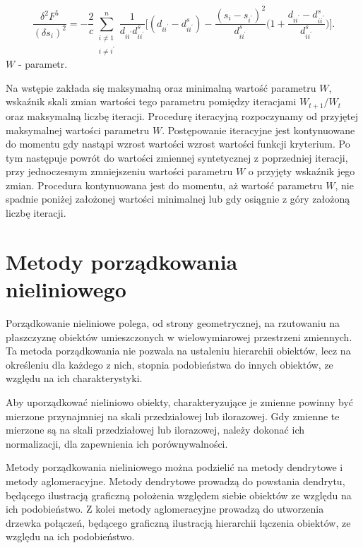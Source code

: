 \documentclass[12pt,a4paper]{report}
\begin{document}
\begin{equation}
\frac{\delta^2 F^{5}}{(\delta s_{i})^{2}}=-\frac{2}{c}\sum_{\substack{i\neq1 \\ i \neq i^{'}}}^n \frac{1}{d_{ii^{'}}d_{ii^{'}}^{s}} \bigg[ (d_{ii^{'}} - d_{ii^{'}}^s) - \frac{(s_i - s_{i^{'}})^2}{d_{ii^{'}}^s} \bigg( 1+ \frac{d_{ii^{'}}-d_{ii^{'}}^{s}}{d_{ii^{'}}^s} \bigg) \bigg].
\end{equation}
\newline
$W$ - parametr.

Na wstępie zakłada się maksymalną oraz minimalną wartość parametru $W$, wskaźnik skali zmian wartości tego parametru pomiędzy iteracjami $W_{t+1}/W_{t}$ oraz maksymalną liczbę iteracji. Procedurę iteracyjną rozpoczynamy od przyjętej maksymalnej wartości parametru $W$. Postępowanie iteracyjne jest kontynuowane do momentu gdy nastąpi wzrost wartości wzrost wartości funkcji kryterium. Po tym następuje powrót do wartości zmiennej syntetycznej z poprzedniej iteracji, przy jednoczesnym zmniejszeniu wartości parametru $W$ o przyjęty wskaźnik jego zmian. Procedura kontynuowana jest do momentu, aż wartość parametru $W$, nie spadnie poniżej założonej wartości minimalnej lub gdy osiągnie z góry założoną liczbę iteracji. 

\section{Metody porządkowania nieliniowego}
\noindent

Porządkowanie nieliniowe polega, od strony geometrycznej, na rzutowaniu na płaszczyznę obiektów umieszczonych w wielowymiarowej przestrzeni zmiennych. Ta metoda porządkowania nie pozwala na ustaleniu hierarchii obiektów, lecz na określeniu dla każdego z nich, stopnia podobieństwa do innych obiektów, ze względu na ich charakterystyki. 

Aby uporządkować nieliniowo obiekty, charakteryzujące je zmienne powinny być mierzone przynajmniej na skali przedziałowej lub ilorazowej. Gdy zmienne te mierzone są na skali przedziałowej lub ilorazowej, należy dokonać ich normalizacji, dla zapewnienia ich porównywalności.

Metody porządkowania nieliniowego można podzielić na metody dendrytowe i metody aglomeracyjne. Metody dendrytowe prowadzą do powstania dendrytu, będącego ilustracją graficzną  położenia względem siebie obiektów ze względu na ich podobieństwo. Z kolei metody aglomeracyjne prowadzą do utworzenia drzewka połączeń, będącego graficzną ilustracją hierarchii łączenia obiektów, ze względu na ich podobieństwo.
\end{document}
